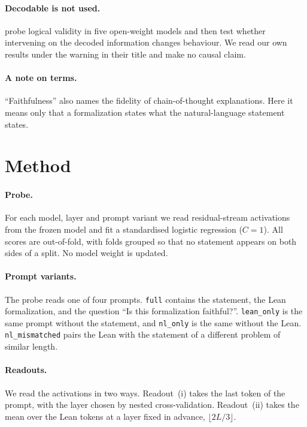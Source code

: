 \documentclass[10pt]{article}
\newcommand{\vr}[1]{\texttt{#1}}
\begin{document}
\paragraph{Decodable is not used.}
\citet{decodability} probe logical validity in five open-weight models and then test
whether intervening on the decoded information changes behaviour. We read our own results under the warning in their
title and make no causal claim.

\paragraph{A note on terms.}
``Faithfulness'' also names the fidelity of chain-of-thought explanations. Here it means only that a formalization
states what the natural-language statement states.

\section{Method}

\paragraph{Probe.}
For each model, layer and prompt variant we read residual-stream activations from the frozen model and fit a
standardised logistic regression ($C = 1$). All scores are out-of-fold, with folds grouped so that no statement
appears on both sides of a split. No model weight is updated.

\paragraph{Prompt variants.}
The probe reads one of four prompts. \vr{full} contains the statement, the Lean formalization, and the question
``Is this formalization faithful?''. \vr{lean\_only} is the same prompt without the statement, and \vr{nl\_only} is
the same without the Lean. \vr{nl\_mismatched} pairs the Lean with the statement of a different problem of similar
length.

\paragraph{Readouts.}
We read the activations in two ways. Readout~(i) takes the last token of the prompt, with the layer chosen by
nested cross-validation. Readout~(ii) takes the mean over the Lean tokens at a layer fixed in advance,
$\lfloor 2L/3 \rfloor$.
\end{document}
